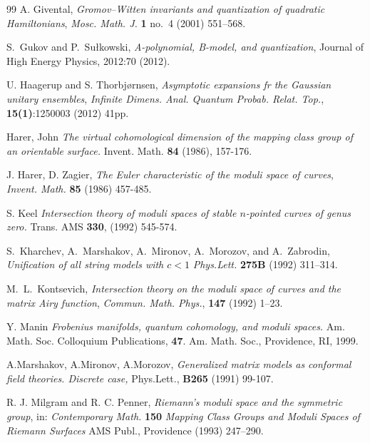 \documentclass[11pt]{article}
\theoremstyle{plain}
\theoremstyle{definition}
\begin{document}
\begin{thebibliography}{99}
A. Givental, {\it Gromov--Witten invariants and quantization of quadratic Hamiltonians}, {\sl Mosc. Math. J.}
{\bf1} no.~4 (2001) 551--568.

S.~Gukov and P.~Su\l kowski,
\emph{A-polynomial, B-model, and quantization},
Journal of High Energy Physics,  2012:70 (2012).

U. Haagerup and S. Thorbj{\o}rnsen, {\it Asymptotic expansions fr the Gaussian unitary ensembles},
{\sl Infinite Dimens. Anal. Quantum Probab. Relat. Top.}, {\bf 15(1)}:1250003 (2012) 41pp.

 Harer, John 
\emph{The virtual cohomological dimension of the mapping class group of an orientable surface.} 
Invent. Math. {\bf 84} (1986), 157-176.

 J. Harer, D. Zagier, {\it The Euler characteristic of the moduli space of curves},
{\sl Invent. Math.} {\bf 85} (1986) 457-485.


 S. Keel
\emph{Intersection theory of moduli spaces of stable $n$-pointed curves of genus zero.}
Trans. AMS {\bf 330}, (1992) 545-574. 


S.~Kharchev, A.~Marshakov, A.~Mironov, A.~Morozov, and A.~Zabrodin, {\it
Unification of all string models with $c<1$} {\sl Phys.Lett.}
{\bf 275B} (1992) 311--314.

M.~L.~Kontsevich,
{\it Intersection theory on the moduli space of curves and the matrix
Airy function}, {\sl Commun. Math. Phys.}, {\bf 147} (1992) 1--23.


 Y. Manin 
\emph{Frobenius manifolds, quantum cohomology, and moduli spaces.} 
Am. Math. Soc. Colloquium Publications, {\bf 47}. Am. Math. Soc., Providence, RI, 1999.


A.Marshakov, A.Mironov, A.Morozov, {\it Generalized matrix
models as conformal field  theories. Discrete case,} Phys.Lett., {\bf B265} (1991) 99-107.

R. J. Milgram and R. C. Penner,
{\it Riemann's moduli space and the symmetric group}, in: {\sl Contemporary Math.} {\bf 150} 
{\sl Mapping Class Groups and Moduli Spaces of Riemann Surfaces} AMS Publ., Providence
(1993) 247--290.


\end{thebibliography}
\end{document}
